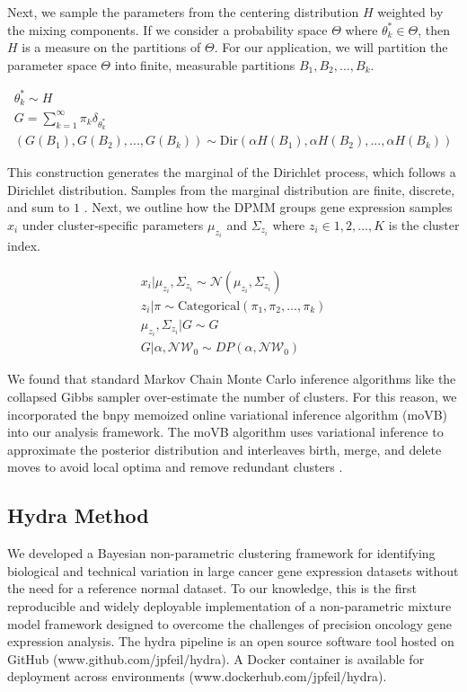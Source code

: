 \documentclass[10pt,letterpaper]{article}
\begin{document}
Next, we sample the parameters from the centering distribution $H$ weighted by the mixing components. If we consider a probability space $\Theta$ where $\theta_k^{*} \in \Theta$, then $H$ is a measure on the partitions of $\Theta$. For our application, we will partition the parameter space $\Theta$ into finite, measurable partitions $B_1, B_2, ..., B_k$. 

\begin{gather}
\theta_k^{*} \sim H \\
G = \sum_{k=1}^{\infty} \pi_k \delta_{\theta_k^{*}} \\
(G(B_1), G(B_2), ..., G(B_k)) \sim \text{Dir}(\alpha H(B_1), \alpha H(B_2), ..., \alpha H(B_k)) 
\end{gather}

This construction generates the marginal of the Dirichlet process, which follows a Dirichlet distribution. Samples from the marginal distribution are finite, discrete, and sum to $1$ \cite{fergusonBayesianAnalysisNonparametric1973}. Next, we outline how the DPMM groups gene expression samples $x_i$ under cluster-specific parameters $\mu_{z_i}$ and $\Sigma_{z_i}$ where $z_i \in {1, 2, ..., K}$ is the cluster index.

\begin{gather}
\label{eq:mm}
x_i | \mu_{z_i}, \Sigma_{z_i} \sim \mathcal{N}(\mu_{z_i}, \Sigma_{z_i}) \\
z_i | \pi \sim \text{Categorical}(\pi_1, \pi_2, ..., \pi_k) \\
\mu_{z_i}, \Sigma_{z_i} | G \sim G \\
G | \alpha, \mathcal{NW}_0 \sim DP(\alpha, \mathcal{NW}_0)
\end{gather}

We found that standard Markov Chain Monte Carlo inference algorithms like the collapsed Gibbs sampler over-estimate the number of clusters. For this reason, we incorporated the bnpy memoized online variational inference algorithm (moVB) \cite{hughes2013memoized} into our analysis framework. The moVB algorithm uses variational inference to approximate the posterior distribution and interleaves birth, merge, and delete moves to avoid local optima and remove redundant clusters \cite{hughesBnpyReliableScalable}. 

\subsection*{Hydra Method}
We developed a Bayesian non-parametric clustering framework for identifying biological and technical variation in large cancer gene expression datasets without the need for a reference normal dataset. To our knowledge, this is the first reproducible and widely deployable implementation of a non-parametric mixture model framework designed to overcome the challenges of precision oncology gene expression analysis. The hydra pipeline is an open source software tool hosted on GitHub (www.github.com/jpfeil/hydra). A Docker container is available for deployment across environments (www.dockerhub.com/jpfeil/hydra).
\end{document}
